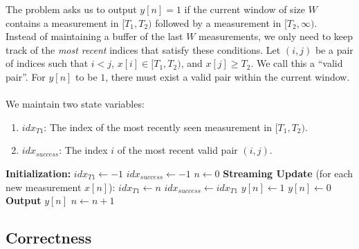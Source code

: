 \documentclass[11pt]{article}
\begin{document}
The problem asks us to output $y[n] = 1$ if the current window of size $W$ contains a measurement in $[T_1, T_2)$ followed by a measurement in $[T_2, \infty)$. \\
Instead of maintaining a buffer of the last $W$ measurements, we only need to keep track of the \textit{most recent} indices that satisfy these conditions. Let $(i, j)$ be a pair of indices such that $i < j$, $x[i] \in [T_1, T_2)$, and $x[j] \ge T_2$. We call this a ``valid pair''. For $y[n]$ to be $1$, there must exist a valid pair within the current window.\\ \\
We maintain two state variables:
\begin{enumerate}
    \item $\textit{idx}_{T1}$: The index of the most recently seen measurement in $[T_1, T_2)$.
    \item $\textit{idx}_{success}$: The index $i$ of the most recent valid pair $(i, j)$.
\end{enumerate}

\begin{algorithm}[H]
\caption{Streaming IoT Threshold Detection}
\begin{algorithmic}[1]
\State \textbf{Initialization:}
\State $\textit{idx}_{T1} \gets -1$ \Comment{Tracks the latest index $i$ where $x[i] \in [T_1, T_2)$}
\State $\textit{idx}_{success} \gets -1$ 
\State $n \gets 0$ 
\State \textbf{Streaming Update} (for each new measurement $x[n]$):
    \State $\textit{idx}_{T1} \gets n$
    \State $\textit{idx}_{success} \gets \textit{idx}_{T1}$
\EndIf
{}
    \State $y[n] \gets 1$
\Else
    \State $y[n] \gets 0$
\EndIf
\State \textbf{Output} $y[n]$
\State $n \gets n + 1$
\end{algorithmic}
\end{algorithm}

\subsection*{Correctness}
\end{document}
